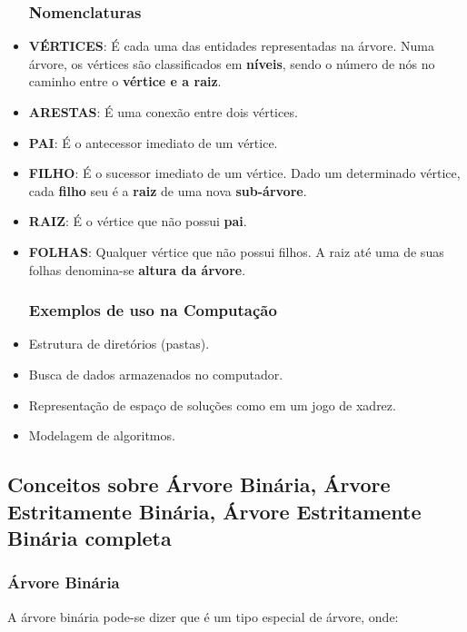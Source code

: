 \documentclass[
	12pt,				%
	oneside,   	        %
	a4paper,			%
	chapter=TITLE,		%
	section=TITLE,		%
	subsection=TITLE,	%
	subsubsection=TITLE,%
	english,			%
	french,				%
	spanish,			%
	brazil,				%
	]{pacotes/abntex2}
\begin{document}
\begin{itemize}
    \subsubsection{\textbf{Nomenclaturas}}
    \item \textbf{VÉRTICES}: É cada uma das entidades representadas na árvore. Numa árvore, os vértices são classificados em \textbf{níveis}, sendo o número de nós no caminho entre o \textbf{vértice e a raiz}.
    \item \textbf{ARESTAS}: É uma conexão entre dois vértices.
    \item \textbf{PAI}: É o antecessor imediato de um vértice.
    \item \textbf{FILHO}: É o sucessor imediato de um vértice. Dado um determinado vértice, cada \textbf{filho} seu é a \textbf{raiz} de uma nova \textbf{sub-árvore}.
    \item \textbf{RAIZ}: É o vértice que não possui \textbf{pai}.
    \item \textbf{FOLHAS}: Qualquer vértice que não possui filhos. A raiz até uma de suas folhas denomina-se \textbf{altura da árvore}.
    \subsubsection{\textbf{Exemplos de uso na Computação}}
    \item Estrutura de diretórios (pastas).
    \item Busca de dados armazenados no computador.
    \item Representação de espaço de soluções como em um jogo de xadrez.
    \item Modelagem de algoritmos.
\end{itemize}

\subsection{\textbf{Conceitos sobre Árvore Binária, Árvore Estritamente Binária, Árvore Estritamente Binária completa}}
\label{subsec:conceitos}

\subsubsection{\textbf{Árvore Binária}}
\label{subsubsec:árvore-binária}

A árvore binária pode-se dizer que é um tipo especial de árvore, onde: 
\end{document}
